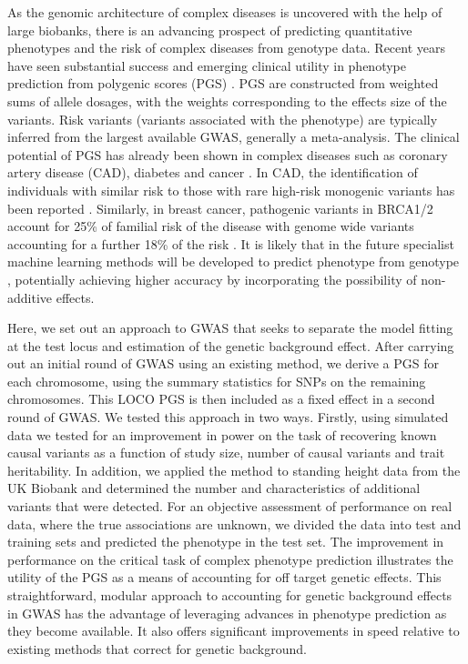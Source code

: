 \documentclass[fleqn,10pt]{wlscirep}
\begin{document}
As the genomic architecture of complex diseases is uncovered with the help of large biobanks, there is an advancing prospect of predicting quantitative phenotypes and the risk of complex diseases from genotype data. Recent years have seen substantial success and emerging clinical utility in phenotype prediction from polygenic scores (PGS) \cite{tam2019benefits,torkamani2018personal}. PGS are constructed from weighted sums of allele dosages, with the weights corresponding to the effects size of the variants. Risk variants (variants associated with the phenotype) are typically inferred from the largest available GWAS, generally a meta-analysis. The clinical potential of PGS has already been shown in complex diseases such as coronary artery disease (CAD), diabetes and cancer  \cite{khera2018genome, torkamani2018personal, yanes2020clinical}. In CAD, the identification of individuals with similar risk to those with rare high-risk monogenic variants has been reported \cite{khera2018genome}. Similarly, in breast cancer, pathogenic variants in BRCA1/2 account for 25\% of familial risk of the disease with genome wide variants accounting for a further 18\% of the risk \cite{michailidou2017association,bahcall2013common}. It is likely that in the future specialist machine learning methods will be developed to predict phenotype from genotype \cite{torkamani2018personal}, potentially achieving higher accuracy by incorporating the possibility of non-additive effects. 


\par\par

Here, we set out an approach to GWAS that seeks to separate the model fitting at the test locus and estimation of the genetic background effect. After carrying out an initial round of GWAS using an existing method, we derive a PGS for each chromosome, using the summary statistics for SNPs on the remaining chromosomes. This LOCO PGS is then included as a fixed effect in a second round of GWAS. We tested this approach in two ways. Firstly, using simulated data we tested for an improvement in power on the task of recovering known causal variants as a function of study size, number of causal variants and trait heritability. In addition, we applied the method to standing height data from the UK Biobank and determined the number and characteristics of additional variants that were detected. For an objective assessment of performance on real data, where the true associations are unknown, we divided the data into test and training sets and predicted the phenotype in the test set. The improvement in performance on the critical task of complex phenotype prediction illustrates the utility of the PGS as a means of accounting for off target genetic effects. This straightforward, modular approach to accounting for genetic background effects in GWAS has the advantage of leveraging advances in phenotype prediction as they become available. It also offers significant improvements in speed relative to existing methods that correct for genetic background. 
\end{document}
